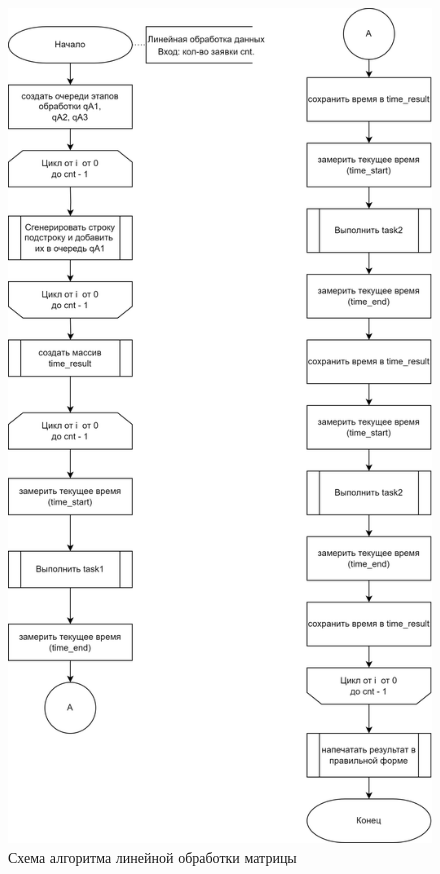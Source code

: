 \begin{figure}[h]
	\centering
	\includegraphics[scale=0.2]{img/linear_processing.png}
	\caption{Схема алгоритма линейной обработки матрицы}
	\label{fig:linear_processing}
\end{figure}

